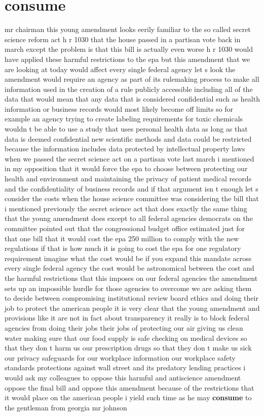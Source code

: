 \documentclass{article}
\begin{document}
\section*{consume}
mr chairman this young amendment looks eerily familiar to the so called secret science reform act h r 1030 that the house passed in a partisan vote back in march except the problem is that this bill is actually even worse h r 1030 would have applied these harmful restrictions to the epa but this amendment that we are looking at today would affect every single federal agency let s look the amendment would require an agency as part of its rulemaking process to make all information used in the creation of a rule publicly accessible including all of the data that would mean that any data that is considered confidential such as health information or business records would most likely become off limits so for example an agency trying to create labeling requirements for toxic chemicals wouldn t be able to use a study that uses personal health data as long as that data is deemed confidential new scientific methods and data could be restricted because the information includes data protected by intellectual property laws when we passed the secret science act on a partisan vote last march i mentioned in my opposition that it would force the epa to choose between protecting our health and environment and maintaining the privacy of patient medical records and the confidentiality of business records and if that argument isn t enough let s consider the costs when the house science committee was considering the bill that i mentioned previously the secret science act that does exactly the same thing that the young amendment does except to all federal agencies democrats on the committee pointed out that the congressional budget office estimated just for that one bill that it would cost the epa 250 million to comply with the new regulations if that is how much it is going to cost the epa for one regulatory requirement imagine what the cost would be if you expand this mandate across every single federal agency the cost would be astronomical between the cost and the harmful restrictions that this imposes on our federal agencies the amendment sets up an impossible hurdle for those agencies to overcome we are asking them to decide between compromising institutional review board ethics and doing their job to protect the american people it is very clear that the young amendment and provisions like it are not in fact about transparency it really is to block federal agencies from doing their jobs their jobs of protecting our air giving us clean water making sure that our food supply is safe checking on medical devices so that they don t harm us our prescription drugs so that they don t make us sick our privacy safeguards for our workplace information our workplace safety standards protections against wall street and its predatory lending practices i would ask my colleagues to oppose this harmful and antiscience amendment oppose the final bill and oppose this amendment because of the restrictions that it would place on the american people i yield such time as he may {\bf \color{red} consume} to the gentleman from georgia mr johnson
\end{document}
